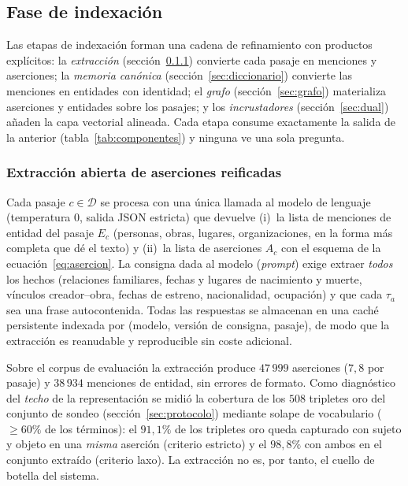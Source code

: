 \documentclass[11pt,a4paper]{article}
\begin{document}
\subsection{Fase de indexación}
\label{sec:indexacion}

Las etapas de indexación forman una cadena de refinamiento con productos
explícitos: la \emph{extracción} (sección~\ref{sec:openie}) convierte cada
pasaje en menciones y aserciones; la \emph{memoria canónica}
(sección~\ref{sec:diccionario}) convierte las menciones en entidades con
identidad; el \emph{grafo} (sección~\ref{sec:grafo}) materializa
aserciones y entidades sobre los pasajes; y los \emph{incrustadores}
(sección~\ref{sec:dual}) añaden la capa vectorial alineada. Cada etapa
consume exactamente la salida de la anterior (tabla~\ref{tab:componentes})
y ninguna ve una sola pregunta.

\subsubsection{Extracción abierta de aserciones reificadas}
\label{sec:openie}

Cada pasaje $c\in\mathcal{D}$ se procesa con una única llamada al modelo de
lenguaje (temperatura $0$, salida JSON estricta) que devuelve (i)~la lista de
menciones de entidad del pasaje $E_c$ (personas, obras, lugares,
organizaciones, en la forma más completa que dé el texto) y (ii)~la lista de
aserciones $A_c$ con el esquema de la ecuación~\eqref{eq:asercion}. La
consigna dada al modelo (\emph{prompt}) exige extraer \emph{todos} los
hechos (relaciones familiares, fechas y
lugares de nacimiento y muerte, vínculos creador--obra, fechas de estreno,
nacionalidad, ocupación) y que cada $\tau_a$ sea una frase autocontenida.
Todas las respuestas se almacenan en una caché persistente indexada por
(modelo, versión de consigna, pasaje), de modo que la extracción es reanudable
y reproducible sin coste adicional.

Sobre el corpus de evaluación la extracción produce $47\,999$ aserciones
($7{,}8$ por pasaje) y $38\,934$ menciones de entidad, sin errores de
formato. Como diagnóstico del \emph{techo} de la representación se midió la
cobertura de los $508$ tripletes oro del conjunto de sondeo
(sección~\ref{sec:protocolo}) mediante solape de vocabulario ($\geq 60\%$ de
los términos): el $91{,}1\%$ de los tripletes oro queda capturado con sujeto
y objeto en una \emph{misma} aserción (criterio estricto) y el $98{,}8\%$
con ambos en el conjunto extraído (criterio laxo). La extracción no es, por
tanto, el cuello de botella del sistema.
\end{document}
